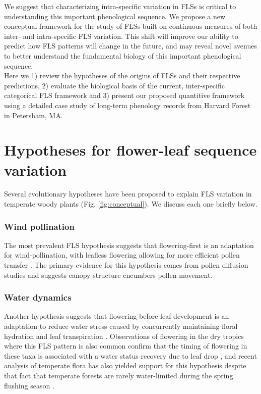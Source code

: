 \documentclass[11pt]{article}
\begin{document}
\noindend We suggest that characterizing intra-specific variation in FLSs is critical to understanding this important phenological sequence. We propose a new conceptual framework for the study of FLSs built on continuous measures of both inter- and intra-specific FLS variation. This shift will improve our ability to predict how FLS patterns will change in the future, and  may reveal novel avenues to better understand the fundamental biology of this important phenological sequence.\\


\noindent Here we 1) review the hypotheses of the origins of FLSs and their respective predictions, 2) evaluate the biological basis of the current, inter-specific categorical FLS framework and 3) present our proposed quantitive framework using a detailed case study of long-term phenology records from Harvard Forest in Petersham, MA.

\section*{Hypotheses for flower-leaf sequence variation}
\noident Several evolutionary hypotheses have been proposed to explain FLS variation in temperate woody plants (Fig. \ref{fig:conceptual}). We discuss each one briefly below.
\subsubsection*{ Wind pollination}
\noindent The most prevalent FLS hypothesis suggests that flowering-first is an adaptation for wind-pollination, with leafless flowering allowing for more efficient pollen transfer \citep{Whitehead1969}. The primary evidence for this hypothesis comes from pollen diffusion studies \citep[e.g., particle movement through closed and open canopies,][]{Niklas1985, Milleron2012} and suggests canopy structure encumbers pollen movement. %
\subsubsection*{Water dynamics}
\noindent Another hypothesis suggests that flowering before leaf development is an adaptation to reduce water stress caused by concurrently maintaining floral hydration and leaf transpiration \citep{Franklin2016}. Observations of flowering in the dry tropics where this FLS pattern is also common confirm that the timing of flowering in these taxa is associated with a water status recovery due to leaf drop \citep{Borchert1983,Reich1984}, and recent analysis of temperate flora has also yielded support for this hypothesis despite that fact that temperate forests are rarely water-limited during the spring flushing season \citep{Gougherty2018}. %
 
\end{document}

